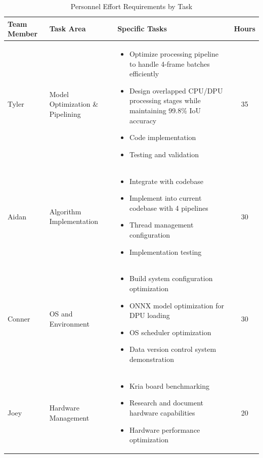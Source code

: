 \begin{table}[htbp]
\centering
\caption{Personnel Effort Requirements by Task}
\begin{tabular}{p{2.5cm}p{3cm}p{5.5cm}c}
\toprule
\textbf{Team Member} & \textbf{Task Area} & \textbf{Specific Tasks} & \textbf{Hours} \\
\midrule
Tyler & Model Optimization \& Pipelining &
\begin{minipage}{5cm}
\begin{itemize}
\item Optimize processing pipeline to handle 4-frame batches efficiently
\item Design overlapped CPU/DPU processing stages while maintaining 99.8\% IoU accuracy
\item Code implementation
\item Testing and validation
\end{itemize}
\end{minipage} & 35 \\
\midrule
Aidan & Algorithm Implementation &
\begin{minipage}{5cm}
\begin{itemize}
\item Integrate with codebase
\item Implement into current codebase with 4 pipelines
\item Thread management configuration
\item Implementation testing
\end{itemize}
\end{minipage} & 30 \\
\midrule
Conner & OS and Environment &
\begin{minipage}{5cm}
\begin{itemize}
\item Build system configuration optimization
\item ONNX model optimization for DPU loading
\item OS scheduler optimization
\item Data version control system demonstration
\end{itemize}
\end{minipage} & 30 \\
\midrule
Joey & Hardware Management &
\begin{minipage}{5cm}
\begin{itemize}
\item Kria board benchmarking
\item Research and document hardware capabilities
\item Hardware performance optimization
\end{itemize}
\end{minipage} & 20 \\
\bottomrule
\end{tabular}
\end{table}

